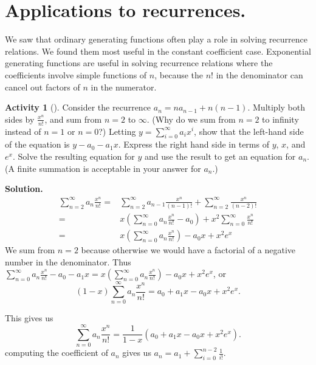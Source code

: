 \documentclass[10pt,]{book}
\theoremstyle{plain}
\theoremstyle{definition}
\newtheorem{activity}[project]{Activity}
\numberwithin{equation}{chapter}
\newcommand{\amp}{&}
\begin{document}
\section[{Applications to recurrences.}]{Applications to recurrences.}\label{section-26}
\typeout{************************************************}
\typeout{************************************************}
We saw that ordinary generating functions often play a role in solving recurrence relations. We found them most useful in the constant coefficient case. Exponential generating functions are useful in solving recurrence relations where the coefficients involve simple functions of \(n\), because the \(n!\) in the denominator can cancel out factors of \(n\) in the numerator.%
\begin{activity}[]\label{activity-348}
Consider the recurrence \(a_n=na_{n-1} +n(n-1)\). Multiply both sides by \(\frac{x^n}{n!}\), and sum from \(n=2\) to \(\infty\). (Why do we sum from \(n=2\) to infinity instead of \(n=1\) or \(n=0\)?) Letting \(y =
\sum_{i=0}^\infty a_ix^i\), show that the left-hand side of the equation is \(y-a_0 -a_1x\). Express the right hand side in terms of \(y\), \(x\), and \(e^x\). Solve the resulting equation for \(y\) and use the result to get an equation for \(a_n\). (A finite summation is acceptable in your answer for \(a_n\).)%
\par\medskip\noindent%
\textbf{Solution.}\quad %
\begin{align*}
\sum_{n=2}^\infty a_n\frac{x^n}{n!}
=\amp \sum_{n=2}^\infty a_{n-1}\frac{x^n}{(n-1)!} + \sum_{n=2}^\infty
\frac{x^n}{(n-2)!}\\
=\amp  x\left(\sum_{n=0}^\infty a_n\frac{x^n}{n!} - a_0\right) +
x^2\sum_{n=0}^\infty \frac{x^n}{n!}\\
=\amp  x\left(\sum_{n=0}^\infty a_n\frac{x^n}{n!}\right) - a_0x
+x^2e^x
\end{align*}
We sum from \(n=2\) because otherwise we would have a factorial of a negative number in the denominator. Thus \(\sum_{n=0}^\infty a_n\frac{x^n}{n!} -a_0-a_1x =  x\left(\sum_{n=0}^\infty a_n\frac{x^n}{n!}\right) - a_0x
+x^2e^x\), or%
\begin{equation*}
(1-x)\sum_{n=0}^\infty a_n\frac{x^n}{n!}=a_0+a_1x-a_0x +x^2e^x.
\end{equation*}
%
\par
This gives us%
\begin{equation*}
\sum_{n=0}^\infty a_n\frac{x^n}{n!}=\frac{1}{1-x}(a_0+a_1x-a_0x
+x^2e^x).
\end{equation*}
computing the coefficient of \(a_n\) gives us \(a_n = a_1 +\sum_{i=0}^{n-2}
\frac{1}{i!}\).%
\end{activity}
\end{document}
